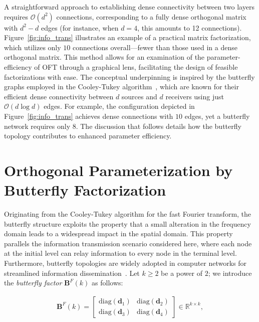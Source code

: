 A straightforward approach to establishing dense connectivity between two layers requires $\mathcal{O}(d^2)$ connections, corresponding to a fully dense orthogonal matrix with $d^2-d$ edges (for instance, when $d=4$, this amounts to 12 connections). Figure~\ref{fig:info_trans} illustrates an example of a practical matrix factorization, which utilizes only $10$ connections overall—fewer than those used in a dense orthogonal matrix. This method allows for an examination of the parameter-efficiency of OFT through a graphical lens, facilitating the design of feasible factorizations with ease. The conceptual underpinning is inspired by the butterfly graphs employed in the Cooley-Tukey algorithm~\cite{cooley1965algorithm}, which are known for their efficient dense connectivity between $d$ sources and $d$ receivers using just $\mathcal{O}(d\log d)$ edges. For example, the configuration depicted in Figure~\ref{fig:info_trans} achieves dense connections with $10$ edges, yet a butterfly network requires only $8$. The discussion that follows details how the butterfly topology contributes to enhanced parameter efficiency.

\section{Orthogonal Parameterization by Butterfly Factorization}

Originating from the Cooley-Tukey algorithm for the fast Fourier transform, the butterfly structure exploits the property that a small alteration in the frequency domain leads to a widespread impact in the spatial domain. This property parallels the information transmission scenario considered here, where each node at the initial level can relay information to every node in the terminal level. Furthermore, butterfly topologies are widely adopted in computer networks for streamlined information dissemination~\cite{solihin2015fundamentals,li2011linear}. Let $k \geq 2$ be a power of $2$; we introduce the \emph{butterfly factor} $\bm{B}^F(k)$ as follows:

\begin{equation}\label{eq:but_factor}
\begin{aligned}
    \bm{B}^F(k)=\begin{bmatrix}
    \text{diag}(\bm{d}_1) & \text{diag}(\bm{d}_2) \\
    \text{diag}(\bm{d}_3) & \text{diag}(\bm{d}_4)
    \end{bmatrix}\in\mathbb{R}^{k\times k},
\end{aligned}
\end{equation}

